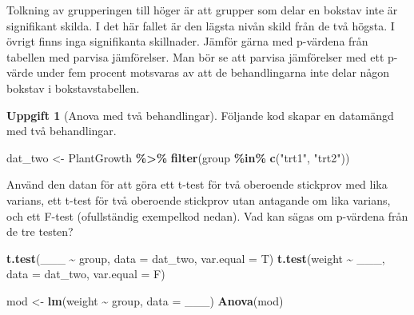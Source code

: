 \documentclass[
]{book}
\newenvironment{Shaded}{\begin{snugshade}}{\end{snugshade}}
\newcommand{\AttributeTok}[1]{\textcolor[rgb]{0.13,0.29,0.53}{#1}}
\newcommand{\FunctionTok}[1]{\textcolor[rgb]{0.13,0.29,0.53}{\textbf{#1}}}
\newcommand{\NormalTok}[1]{#1}
\newcommand{\OtherTok}[1]{\textcolor[rgb]{0.56,0.35,0.01}{#1}}
\newcommand{\SpecialCharTok}[1]{\textcolor[rgb]{0.81,0.36,0.00}{\textbf{#1}}}
\newcommand{\StringTok}[1]{\textcolor[rgb]{0.31,0.60,0.02}{#1}}
\theoremstyle{definition}
\theoremstyle{definition}
\theoremstyle{definition}
\newtheorem{exercise}{Uppgift}[chapter]
\theoremstyle{definition}
\theoremstyle{remark}
\begin{document}
Tolkning av grupperingen till höger är att grupper som delar en bokstav inte är signifikant skilda. I det här fallet är den lägsta nivån skild från de två högsta. I övrigt finns inga signifikanta skillnader. Jämför gärna med p-värdena från tabellen med parvisa jämförelser. Man bör se att parvisa jämförelser med ett p-värde under fem procent motsvaras av att de behandlingarna inte delar någon bokstav i bokstavstabellen.

\begin{exercise}[Anova med två behandlingar]

Följande kod skapar en datamängd med två behandlingar.

\begin{Shaded}
\begin{Highlighting}[]
\NormalTok{dat\_two }\OtherTok{\textless{}{-}}\NormalTok{ PlantGrowth }\SpecialCharTok{\%\textgreater{}\%} \FunctionTok{filter}\NormalTok{(group }\SpecialCharTok{\%in\%} \FunctionTok{c}\NormalTok{(}\StringTok{"trt1"}\NormalTok{, }\StringTok{"trt2"}\NormalTok{))}
\end{Highlighting}
\end{Shaded}

Använd den datan för att göra ett t-test för två oberoende stickprov med lika varians, ett t-test för två oberoende stickprov utan antagande om lika varians, och ett F-test (ofullständig exempelkod nedan). Vad kan sägas om p-värdena från de tre testen?

\begin{Shaded}
\begin{Highlighting}[]
\FunctionTok{t.test}\NormalTok{(\_\_\_ }\SpecialCharTok{\textasciitilde{}}\NormalTok{ group, }\AttributeTok{data =}\NormalTok{ dat\_two, }\AttributeTok{var.equal =}\NormalTok{ T)}
\FunctionTok{t.test}\NormalTok{(weight }\SpecialCharTok{\textasciitilde{}}\NormalTok{ \_\_\_, }\AttributeTok{data =}\NormalTok{ dat\_two, }\AttributeTok{var.equal =}\NormalTok{ F)}

\NormalTok{mod }\OtherTok{\textless{}{-}} \FunctionTok{lm}\NormalTok{(weight }\SpecialCharTok{\textasciitilde{}}\NormalTok{ group, }\AttributeTok{data =}\NormalTok{ \_\_\_)}
\FunctionTok{Anova}\NormalTok{(mod)}
\end{Highlighting}
\end{Shaded}

\end{exercise}
\end{document}
